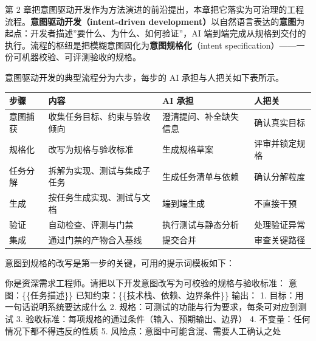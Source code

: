 \documentclass[
]{ctexbook}
\newenvironment{Shaded}{
  \ttfamily\small
}{}
\newcommand{\NormalTok}[1]{#1}
\newcounter{none}
\begin{document}
第 2
章把意图驱动开发作为方法演进的前沿提出，本章把它落实为可治理的工程流程。\textbf{意图驱动开发（intent-driven
development）}以自然语言表达的\textbf{意图}为起点：开发者描述''要什么、为什么、如何验证''，AI
端到端完成从规格到交付的执行。流程的枢纽是把模糊意图固化为\textbf{意图规格化}（intent
specification）------一份可机器校验、可评测验收的规格。

意图驱动开发的典型流程分为六步，每步的 AI 承担与人把关如下表所示。

{\def\LTcaptype{none} %
\begin{longtable}[]{@{}
  >{\raggedright\arraybackslash}p{}
  >{\raggedright\arraybackslash}p{}
  >{\raggedright\arraybackslash}p{}
  >{\raggedright\arraybackslash}p{}@{}}
\toprule\noalign{}
\begin{minipage}[b]{\linewidth}\raggedright
步骤
\end{minipage} & \begin{minipage}[b]{\linewidth}\raggedright
内容
\end{minipage} & \begin{minipage}[b]{\linewidth}\raggedright
AI 承担
\end{minipage} & \begin{minipage}[b]{\linewidth}\raggedright
人把关
\end{minipage} \\
\midrule\noalign{}
\endhead
\bottomrule\noalign{}
\endlastfoot
意图捕获 & 收集任务目标、约束与验收倾向 & 澄清提问、补全缺失信息 &
确认真实目标 \\
规格化 & 改写为规格与验收标准 & 生成规格草案 & 评审并锁定规格 \\
任务分解 & 拆解为实现、测试与集成子任务 & 生成任务清单与依赖 &
确认分解粒度 \\
生成 & 按任务生成实现、测试与文档 & 端到端生成 & 不直接干预 \\
验证 & 自动检查、评测与门禁 & 执行测试与静态分析 & 处理验证异常 \\
集成 & 通过门禁的产物合入基线 & 提交合并 & 审查关键路径 \\
\end{longtable}
}

意图到规格的改写是第一步的关键，可用的提示词模板如下：

\begin{Shaded}
\begin{Highlighting}[]
\NormalTok{你是资深需求工程师。请把以下开发意图改写为可校验的规格与验收标准：}
\NormalTok{意图：\{\{任务描述\}\}}
\NormalTok{已知约束：\{\{技术栈、依赖、边界条件\}\}}
\NormalTok{输出：}
\NormalTok{1. 目标：用一句话说明系统要达成什么}
\NormalTok{2. 规格：可测试的功能与行为要求，每条可对应到测试}
\NormalTok{3. 验收标准：每项规格的通过条件（输入、预期输出、边界）}
\NormalTok{4. 不变量：任何情况下都不得违反的性质}
\NormalTok{5. 风险点：意图中可能含混、需要人工确认之处}
\end{Highlighting}
\end{Shaded}
\end{document}
